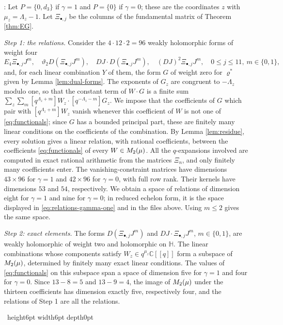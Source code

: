 \documentclass[leqno]{article}
\newcommand{\Cbb}{\ensuremath{\mathbb{C}}}
\let\cal\relax
\newcommand{\cal}{\mathcal}
\renewcommand{\leq}{\ensuremath{\leqslant}}
\newcommand{\qed}{\hfill \vrule height6pt  width6pt depth0pt}
\newenvironment{proof}[1][]{\noindent {\it Proof #1} : }{\hbox{~}\qed
\smallskip
}
\numberwithin{equation}{section}
\begin{document}
\begin{proof}
Let $P = \{0,d_3\}$ if $\gamma = 1$ and $P = \{0\}$ if $\gamma = 0$; these are the coordinates $z$ with $\mu_z = \Lambda_z-1$. Let $\Xi_{\bullet,j}$ be the columns of the fundamental matrix of Theorem \ref{thm:EG}.

\textit{Step 1: the relations.} Consider the $4 \cdot 12 \cdot 2 = 96$ weakly holomorphic forms of weight four
\[
E_4 \Xi_{\bullet,j}J^m,\quad \vartheta_2D(\Xi_{\bullet,j}J^m),\quad DJ \cdot D(\Xi_{\bullet,j}J^m),\quad (DJ)^2 \Xi_{\bullet,j}J^m,\quad 0 \leq j \leq 11,\ m \in \{0,1\},
\]
and, for each linear combination $Y$ of them, the form $G$ of weight zero for $\varrho^*$ given by Lemma \ref{lem:dual-forms}. The exponents of $G_z$ are congruent to $-\Lambda_z$ modulo one, so that the constant term of $W \cdot G$ is a finite sum $\sum_z\sum_m [q^{\Lambda_z+m}]W_z \cdot [q^{-\Lambda_z-m}]G_z$. We impose that the coefficients of $G$ which pair with $[q^{\Lambda_z+m}]W_z$ vanish whenever this coefficient of $W$ is not one of \eqref{eq:functionals}; since $G$ has a bounded principal part, these are finitely many linear conditions on the coefficients of the combination. By Lemma \ref{lem:residue}, every solution gives a linear relation, with rational coefficients, between the coefficients \eqref{eq:functionals} of every $W \in \cal M_2(\mu)$. All the $q$-expansions involved are computed in exact rational arithmetic from the matrices $\Xi_n$, and only finitely many coefficients enter. The vanishing-constraint matrices have dimensions $43 \times 96$ for $\gamma = 1$ and $42 \times 96$ for $\gamma = 0$, with full row rank. Their kernels have dimensions $53$ and $54$, respectively. We obtain a space of relations of dimension eight for $\gamma = 1$ and nine for $\gamma = 0$; in reduced echelon form, it is the space displayed in \eqref{eq:relations-gamma-one} and in the files above. Using $m \leq 2$ gives the same space.

\textit{Step 2: exact elements.} The forms $D(\Xi_{\bullet,j}J^m)$ and $DJ \cdot \Xi_{\bullet,j}J^m$, $m \in \{0,1\}$, are weakly holomorphic of weight two and holomorphic on $\mathbb H$. The linear combinations whose components satisfy $W_z \in q^{\mu_z}\Cbb[[q]]$ form a subspace of $\cal M_2(\mu)$, determined by finitely many exact linear conditions. The values of \eqref{eq:functionals} on this subspace span a space of dimension five for $\gamma = 1$ and four for $\gamma = 0$. Since $13-8 = 5$ and $13-9 = 4$, the image of $\cal M_2(\mu)$ under the thirteen coefficients has dimension exactly five, respectively four, and the relations of Step 1 are all the relations.


\end{proof}
\end{document}
